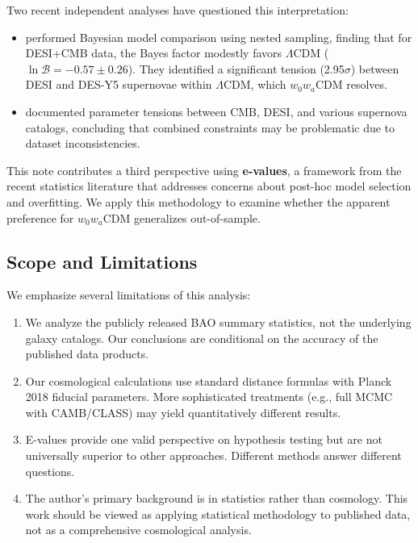 \documentclass[11pt,a4paper]{article}
\newcommand{\LCDM}{$\Lambda$CDM}
\begin{document}
Two recent independent analyses have questioned this interpretation:
\begin{itemize}
    \item \citet{OngBayesian2025} performed Bayesian model comparison using nested sampling, finding that for DESI+CMB data, the Bayes factor modestly favors \LCDM{} ($\ln \mathcal{B} = -0.57 \pm 0.26$). They identified a significant tension (2.95$\sigma$) between DESI and DES-Y5 supernovae within \LCDM{}, which $w_0w_a$CDM resolves.

    \item \citet{WangMota2025} documented parameter tensions between CMB, DESI, and various supernova catalogs, concluding that combined constraints may be problematic due to dataset inconsistencies.
\end{itemize}

This note contributes a third perspective using \textbf{e-values}, a framework from the recent statistics literature \citep{Vovk2021,Shafer2021,Ramdas2023} that addresses concerns about post-hoc model selection and overfitting. We apply this methodology to examine whether the apparent preference for $w_0w_a$CDM generalizes out-of-sample.

\subsection{Scope and Limitations}

We emphasize several limitations of this analysis:
\begin{enumerate}
    \item We analyze the publicly released BAO summary statistics, not the underlying galaxy catalogs. Our conclusions are conditional on the accuracy of the published data products.

    \item Our cosmological calculations use standard distance formulas with Planck 2018 fiducial parameters. More sophisticated treatments (e.g., full MCMC with CAMB/CLASS) may yield quantitatively different results.

    \item E-values provide one valid perspective on hypothesis testing but are not universally superior to other approaches. Different methods answer different questions.

    \item The author's primary background is in statistics rather than cosmology. This work should be viewed as applying statistical methodology to published data, not as a comprehensive cosmological analysis.
\end{enumerate}
\end{document}
